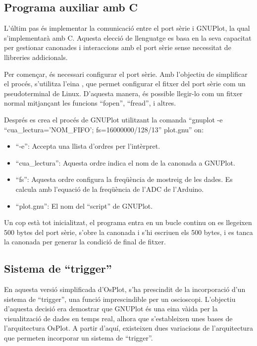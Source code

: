 \documentclass{tfgitic}[2023/06/30]
\begin{document}
\newpage

\subsection{Programa auxiliar amb C}

L'últim pas és implementar la comunicació entre el port sèrie i
GNUPlot, la qual s'implementarà amb C. Aquesta elecció de llenguatge
es basa en la seva capacitat per gestionar canonades i interaccions
amb el port sèrie sense necessitat de llibreries addicionals.

Per començar, és necessari configurar el port sèrie. Amb l'objectiu
de simplificar el procés, s'utilitza l'eina \cite[stty]{stty}, que
permet configurar el fitxer del port sèrie com un pseudoterminal de
Linux. D'aquesta manera, és possible llegir-lo com un fitxer normal
mitjançant les funcions ``fopen'', ``fread'', i altres.

Després es crea el procés de GNUPlot utilitzant la comanda ``gnuplot
-e ``cua\_lectura='NOM\_FIFO'; fs=16000000/128/13'' plot.gnu'' on:
\begin{itemize}
      \item ``-e'': Accepta una llista d'ordres per l'intèrpret.
      \item ``cua\_lectura'': Aquesta ordre indica el nom de la
            canonada a GNUPlot.
      \item ``fs'': Aquesta ordre configura la freqüència de mostreig de
            les dades. Es calcula amb l'equació de la freqüència de l'ADC de
            l'Arduino.
      \item ``plot.gnu'': El nom del ``script'' de GNUPlot.
\end{itemize}

Un cop està tot inicialitzat, el programa entra en un bucle continu on
es llegeixen 500 bytes del port sèrie, s'obre la canonada i s'hi
escriuen els 500 bytes, i es tanca la canonada per generar la condició
de final de fitxer.

\subsection{Sistema de ``trigger''}

En aquesta versió simplificada d'OsPlot, s'ha prescindit de la
incorporació d'un sistema de ``trigger'', una funció imprescindible
per un osci\lgem oscopi. L'objectiu d'aquesta decisió era demostrar
que GNUPlot és una eina và\lgem ida per la visualització de dades en
temps real, alhora que s'estableixen unes bases de l'arquitectura
OsPlot. A partir d'aquí, existeixen dues variacions de l'arquitectura
que permeten incorporar un sistema de ``trigger''.
\end{document}

